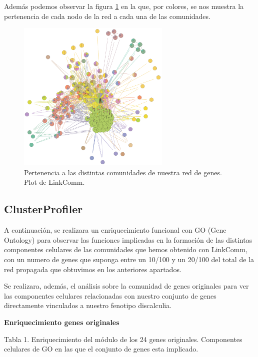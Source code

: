 Además podemos observar la figura \ref{fig:LinkComm3} en la que, por colores, se nos muestra la pertenencia de cada nodo de la red a cada una de las comunidades.

\begin{figure}[h]
	\centering
	\includegraphics[width=0.65\textwidth]{figures/Grafo_Linkcomm.PNG}
	\caption{Pertenencia a las distintas comunidades de nuestra red de genes. Plot de LinkComm.}
	\label{fig:LinkComm3}
\end{figure}

\newpage

\subsection{ClusterProfiler}

\hfill

A continuación, se realizara un enriquecimiento funcional con GO (Gene Ontology) para observar las funciones implicadas en la formación de las distintas componentes celulares de las comunidades que hemos obtenido con LinkComm, con un numero de genes que suponga entre un 10/100 y un 20/100 del total de la red propagada que obtuvimos en los anteriores apartados.

\hfill

Se realizara, además, el análisis sobre la comunidad de genes originales para ver las componentes celulares relacionadas con nuestro conjunto de genes directamente vinculados a nuestro fenotipo discalculia.

\hfill


\textbf{Enriquecimiento genes originales}

 Tabla 1. Enriquecimiento del módulo de los 24 genes originales. Componentes celulares de GO en las que el conjunto de genes esta implicado.

